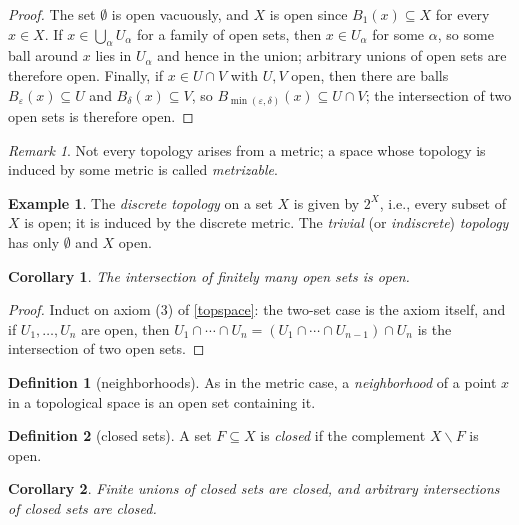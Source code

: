 \documentclass[11pt]{article}
\newtheorem{corollary}{Corollary}[section]
\theoremstyle{definition}
\newtheorem{definition}{Definition}[section]
\newtheorem{example}{Example}[section]
\theoremstyle{remark}
\newtheorem{remark}{Remark}[section]
\begin{document}
\begin{proof}
    The set $\emptyset$ is open vacuously, and $X$ is open since $B_1(x) \subseteq X$ for every $x \in X$. If $x \in \bigcup_\alpha U_\alpha$ for a family of open sets, then $x \in U_\alpha$ for some $\alpha$, so some ball around $x$ lies in $U_\alpha$ and hence in the union; arbitrary unions of open sets are therefore open. Finally, if $x \in U \cap V$ with $U, V$ open, then there are balls $B_\varepsilon(x) \subseteq U$ and $B_\delta(x) \subseteq V$, so $B_{\min(\varepsilon, \delta)}(x) \subseteq U \cap V$; the intersection of two open sets is therefore open.
\end{proof}

\begin{remark}
    Not every topology arises from a metric; a space whose topology is induced by some metric is called \emph{metrizable}.
\end{remark}

\begin{example}
    The \emph{discrete topology} on a set $X$ is given by $2^X$, i.e., every subset of $X$ is open; it is induced by the discrete metric. The \emph{trivial} (or \emph{indiscrete}) \emph{topology} has only $\emptyset$ and $X$ open.
\end{example}

\begin{corollary}
    \label{fininteropen}
    The intersection of finitely many open sets is open.
\end{corollary}

\begin{proof}
    Induct on axiom (3) of \cref{topspace}: the two-set case is the axiom itself, and if $U_1, \ldots, U_n$ are open, then $U_1 \cap \cdots \cap U_n = (U_1 \cap \cdots \cap U_{n-1}) \cap U_n$ is the intersection of two open sets.
\end{proof}

\begin{definition}[neighborhoods]
    As in the metric case, a \emph{neighborhood} of a point $x$ in a topological space is an open set containing it.
\end{definition}

\begin{definition}[closed sets]
    A set $F \subseteq X$ is \emph{closed} if the complement $X \smallsetminus F$ is open.
\end{definition}

\begin{corollary}
    Finite unions of closed sets are closed, and arbitrary intersections of closed sets are closed.
\end{corollary}
\end{document}

